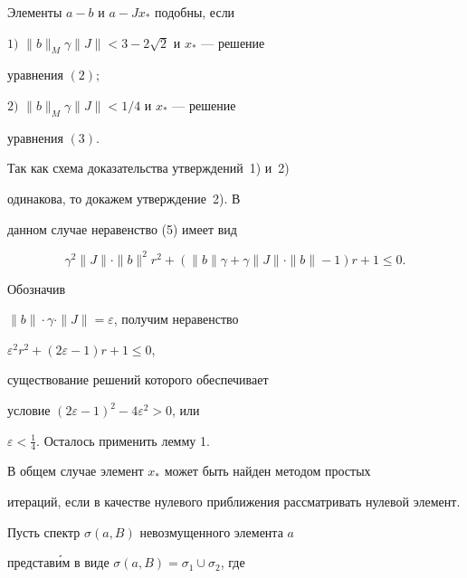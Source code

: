 \begin{thm}


Элементы $a-b$ и $a-Jx_*$ подобны, если





$1)$ $\|b\|_M\gamma\|J\|<3-2\sqrt2$ и $x_*$ --- решение


уравнения $(2);$





$2)$ $\|b\|_M\gamma\|J\|<1/4$ и $x_*$ --- решение


уравнения $(3)$.


\end{thm}








\begin{pf}


Так как схема доказательства утверждений~1) и~2)


одинакова, то докажем утверждение~2). В


данном случае неравенство (5) имеет вид


$$


\gamma^2\|J\|\cdot\|b\|^2r^2+(\|b\|\gamma+\gamma\|J\|\cdot


\|b\|-1)r+1\leq 0.


$$


Обозначив


$\|b\|\cdot\gamma\cdot\|J\|=\varepsilon$, получим неравенство


$\varepsilon^2r^2+(2\varepsilon-1)r+1\leq0$,


существование решений которого обеспечивает


условие $(2\varepsilon-1)^2-4\varepsilon^2>0$, или


$\varepsilon<\frac14$. Осталось применить лемму 1.





В общем случае элемент $x_*$ может быть найден методом простых


итераций, если в качестве нулевого приближения рассматривать нулевой элемент.


\end{pf}





Пусть спектр $\sigma(a,B)$ невозмущенного элемента $a$


представ\'им в виде $\sigma(a,B)=\sigma_1\cup\sigma_2$, где


